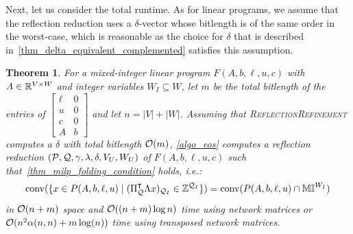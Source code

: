 \documentclass[pdflatex,sn-mathphys-num]{sn-jnl}%
\theoremstyle{thmstyleone}%
\newtheorem{theorem}[theorem]{Theorem}
\theoremstyle{thmstylethree}%
\theoremstyle{thmstyletwo}%
\newcommand{\conv}{\mathrm{conv}}
\begin{document}
Next, let us consider the total runtime. As for linear programs, we assume that the reflection reduction uses a $\delta$-vector whose bitlength is of the same order in the worst-case, which is reasonable as the choice for $\delta$ that is described in~\cref{thm_delta_equivalent_complemented} satisfies this assumption.
\begin{theorem}
For a mixed-integer linear program $F(A,b,\ell,u,c)$ with $A\in \mathbb{R}^{V\times W}$ and integer variables $W_I\subseteq W$, let $m$ be the total bitlength of the entries of $\begin{bmatrix}
    \ell & 0 \\
    u & 0 \\
    c & 0\\
    A & b
\end{bmatrix}$ and let $n = |V| + |W|$. Assuming that \textsc{ReflectionRefinement} computes a $\delta$ with total bitlength $\orderO(m)$, \cref{algo_eos} computes a  reflection reduction $(\mathcal{P},\mathcal{Q},\gamma,\lambda,\delta,V_U,W_U)$ of $F(A,b,\ell,u,c)$ such that~\eqref{thm_milp_folding_condition} holds, i.e.:
\begin{equation*}
    \conv(\{x\in P(A,b,\ell,u) \mid (\transpose{\Pi_{\MQ}} \Lambda x)_{\MQ_I} \in \Z^{\MQ_I}\}) = \conv(P(A,b,\ell,u)\cap \M^{W_I})
\end{equation*}
in $\orderO(n+m)$ space and $\orderO((n+m)\log n)$ time using network matrices or $\orderO(n^2\alpha(n,n) + m \log(n))$ time using transposed network matrices.
\end{theorem}
\end{document}
